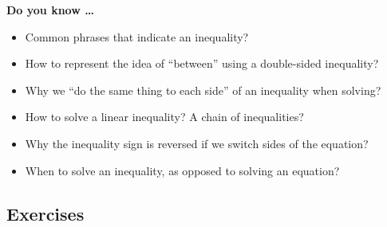 
 

\noindent \textbf{Do you know \ldots}

\begin{itemize}
\item Common phrases that indicate an inequality? 
\item How to represent the idea of ``between'' using a double-sided inequality? 
\item Why we ``do the same thing to each side'' of an inequality when solving? 
\item How to solve a linear inequality? A chain of inequalities?
\item Why the inequality sign is reversed if we switch sides of the equation? 
\item When to solve an inequality, as opposed to solving an equation? 
 
\end{itemize}

\subsection*{Exercises}

